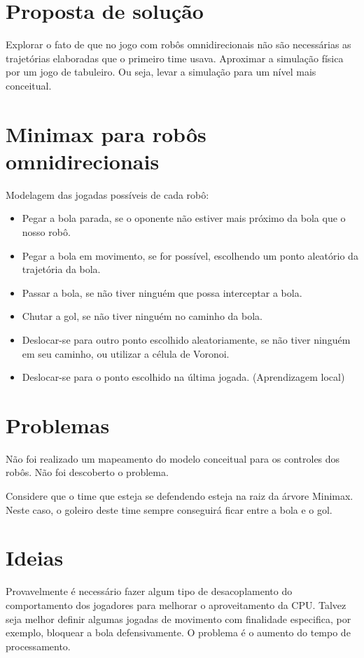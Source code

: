 \section{Proposta de solução}

Explorar o fato de que no jogo com robôs omnidirecionais não são necessárias as
trajetórias elaboradas que o primeiro time usava.  Aproximar a simulação física
por um jogo de tabuleiro. Ou seja, levar a simulação para um nível mais
conceitual.

\section{Minimax para robôs omnidirecionais}

Modelagem das jogadas possíveis de cada robô:

\begin{itemize}
 \item Pegar a bola parada, se o oponente não estiver mais próximo da bola que o
 nosso robô.
 \item Pegar a bola em movimento, se for possível, escolhendo um ponto aleatório
 da trajetória da bola.
 \item Passar a bola, se não tiver ninguém que possa interceptar a bola.
 \item Chutar a gol, se não tiver ninguém no caminho da bola.
 \item Deslocar-se para outro ponto escolhido aleatoriamente, se não tiver ninguém
 em seu caminho, ou utilizar a célula de Voronoi.
 \item Deslocar-se para o ponto escolhido na última jogada. (Aprendizagem local)
\end{itemize}

\section{Problemas}

Não foi realizado um mapeamento do modelo conceitual para os controles dos
robôs. Não foi descoberto o problema.

Considere que o time que esteja se defendendo esteja na raiz da árvore Minimax.
Neste caso, o goleiro deste time sempre conseguirá ficar entre a bola e o gol.

\section{Ideias}

Provavelmente é necessário fazer algum tipo de desacoplamento do comportamento dos
jogadores para melhorar o aproveitamento da CPU\@.  Talvez seja melhor definir
algumas jogadas de movimento com finalidade especifica, por exemplo, bloquear a
bola defensivamente. O problema é o aumento do tempo de processamento.

